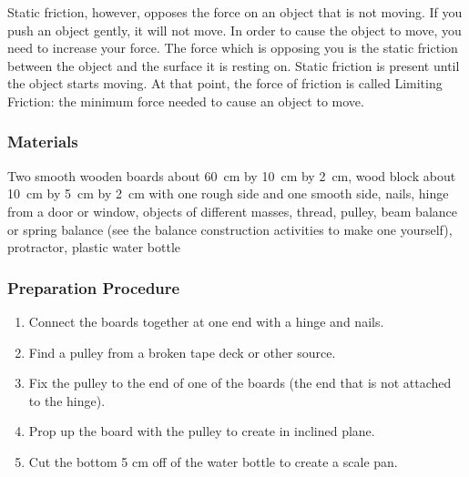 Static friction, however, opposes the force on an object that is not moving. If you push an object gently, it will not move. In order to cause the object to move, you need to increase your force. The force which is opposing you is the static friction between the object and the surface it is resting on. Static friction is present until the object starts moving. At that point, the force of friction is called Limiting Friction: the minimum force needed to cause an object to move.  

\subsubsection*{Materials}
Two smooth wooden boards about 60~cm by 10~cm by 2~cm, wood block about 10~cm by 5~cm by 2~cm with one rough side and one smooth side, nails, hinge from a door or window, objects of different masses, thread, pulley, beam balance or spring balance (see the balance construction activities to make one yourself), protractor, plastic water bottle

\subsubsection*{Preparation Procedure}
\begin{enumerate}
\item{Connect the boards together at one end with a hinge and nails.} 
\item{Find a pulley from a broken tape deck or other source.} 
\item{Fix the pulley to the end of one of the boards (the end that is not attached to the hinge).} 
\item{Prop up the board with the pulley to create in inclined plane.} 
\item{Cut the bottom 5 cm off of the water bottle to create a scale pan.} 
\end{enumerate}

